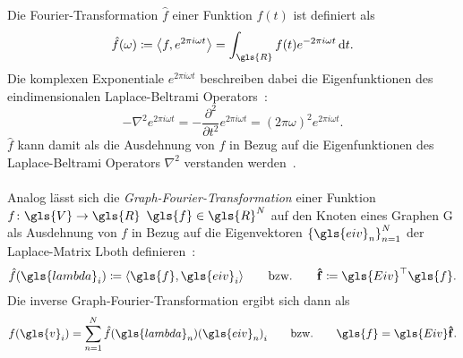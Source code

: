 Die Fourier-Transformation $\hat f$ einer Funktion $f\left(t\right)$ ist definiert als~\cite{Shuman}
\begin{equation*}
  \hat f\left(\omega\right) \coloneqq \left\langle f, e^{2\pi i\omega t} \right\rangle = \int_{\gls{R}} f\left(t\right)e^{-2\pi i\omega t}\,\mathrm{d}t.
\end{equation*}
Die komplexen Exponentiale $e^{2\pi i\omega t}$ beschreiben dabei die Eigenfunktionen des eindimensionalen Laplace-Beltrami Operators~\cite{Shuman}:
\begin{equation}
  - \nabla^2 e^{2\pi i\omega t} = - \frac{\partial^2}{\partial t^2} e^{2\pi i \omega t} = {\left(2\pi \omega\right)}^2 e^{2\pi i\omega t}.
  \label{eq:laplace_eigenfunktionen}
\end{equation}
$\hat f$ kann damit als die Ausdehnung von $f$ in Bezug auf die Eigenfunktionen des Laplace-Beltrami Operators $\nabla^2$ verstanden werden~\cite{Hammond}.
\\\\
Analog lässt sich die \emph{Graph-Fourier-Transformation} einer Funktion $f \colon \gls{V} \to \gls{R}$ \bzw{} $\gls{f} \in \gls{R}^N$ auf den Knoten eines Graphen \gls{G} als Ausdehnung von $f$ in Bezug auf die Eigenvektoren ${\left\{\gls{eiv}_n\right\}}_{n=1}^N$ der Laplace-Matrix \gls{Lboth} definieren~\cite{Shuman}:
\begin{equation}
  \hat f\left(\gls{lambda}_i\right) \coloneqq \left\langle \gls{f}, \gls{eiv}_i \right\rangle
  \qquad
  \text{\bzw{}}
  \qquad
  \ve{\hat f} \coloneqq \gls{Eiv}^{\top}\gls{f}.
  \label{eq:graph_fourier_transformation}
\end{equation}
Die inverse Graph-Fourier-Transformation ergibt sich dann als~\cite{Shuman}
\begin{equation}
  f\left(\gls{v}_i\right) = \sum_{n=1}^N \hat f\left(\gls{lambda}_n\right) {\left(\gls{eiv}_n\right)}_i
  \qquad
  \text{\bzw{}}
  \qquad
  \gls{f} = \gls{Eiv}\ve{\hat f}.
  \label{eq:inverse_graph_fourier_transformation}
\end{equation}

